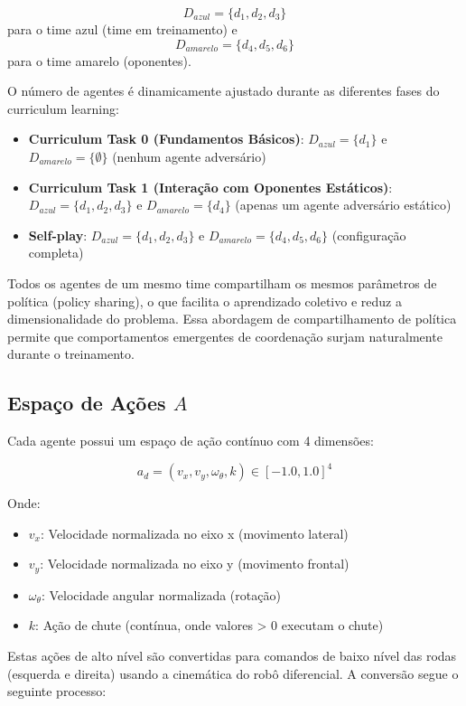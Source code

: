 $$D_{azul} = \{d_1, d_2, d_3\}$$ para o time azul (time em treinamento) e $$D_{amarelo} = \{d_4, d_5, d_6\}$$ para o time amarelo (oponentes).

O número de agentes é dinamicamente ajustado durante as diferentes fases do curriculum learning:

\begin{itemize}
    \item \textbf{Curriculum Task 0 (Fundamentos Básicos)}: $D_{azul} = \{d_1\}$ e $D_{amarelo} = \{\emptyset\}$ (nenhum agente adversário)
    \item \textbf{Curriculum Task 1 (Interação com Oponentes Estáticos)}: $D_{azul} = \{d_1, d_2, d_3\}$ e $D_{amarelo} = \{d_4\}$ (apenas um agente adversário estático)
    \item \textbf{Self-play}: $D_{azul} = \{d_1, d_2, d_3\}$ e $D_{amarelo} = \{d_4, d_5, d_6\}$ (configuração completa)
\end{itemize}

Todos os agentes de um mesmo time compartilham os mesmos parâmetros de política (policy sharing), o que facilita o aprendizado coletivo e reduz a dimensionalidade do problema. Essa abordagem de compartilhamento de política permite que comportamentos emergentes de coordenação surjam naturalmente durante o treinamento.

\subsection{Espaço de Ações $A$}

Cada agente possui um espaço de ação contínuo com 4 dimensões:

$$a_d = (v_x, v_y, \omega_{\theta}, k) \in [-1.0, 1.0]^4$$

Onde:
\begin{itemize}
    \item $v_x$: Velocidade normalizada no eixo x (movimento lateral)
    \item $v_y$: Velocidade normalizada no eixo y (movimento frontal)
    \item $\omega_{\theta}$: Velocidade angular normalizada (rotação)
    \item $k$: Ação de chute (contínua, onde valores > 0 executam o chute)
\end{itemize}

Estas ações de alto nível são convertidas para comandos de baixo nível das rodas (esquerda e direita) usando a cinemática do robô diferencial. A conversão segue o seguinte processo:

